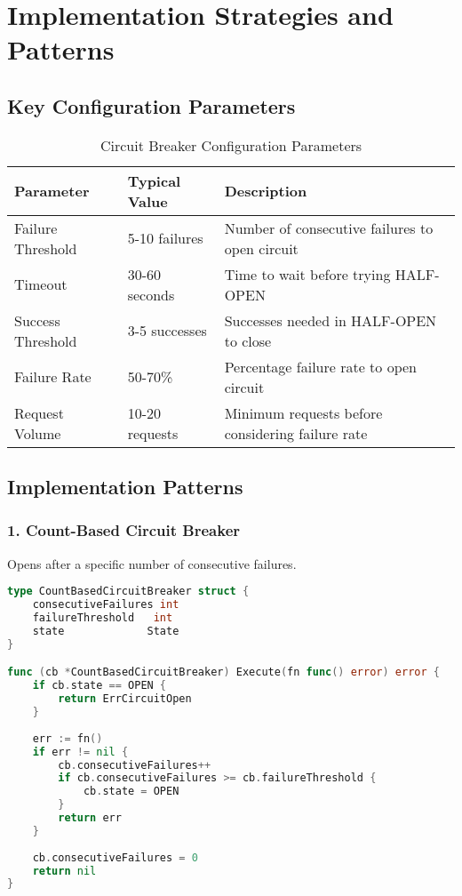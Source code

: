 \documentclass[12pt,a4paper]{article}
\begin{document}
\section{Implementation Strategies and Patterns}

\subsection{Key Configuration Parameters}

\begin{table}[H]
\centering
\begin{tabular}{|l|l|p{6cm}|}
\hline
\textbf{Parameter} & \textbf{Typical Value} & \textbf{Description} \\
\hline
Failure Threshold & 5-10 failures & Number of consecutive failures to open circuit \\
\hline
Timeout & 30-60 seconds & Time to wait before trying HALF-OPEN \\
\hline
Success Threshold & 3-5 successes & Successes needed in HALF-OPEN to close \\
\hline
Failure Rate & 50-70\% & Percentage failure rate to open circuit \\
\hline
Request Volume & 10-20 requests & Minimum requests before considering failure rate \\
\hline
\end{tabular}
\caption{Circuit Breaker Configuration Parameters}
\end{table}

\subsection{Implementation Patterns}

\subsubsection{1. Count-Based Circuit Breaker}
Opens after a specific number of consecutive failures.

\begin{lstlisting}[language=Go, caption=Count-Based Circuit Breaker Logic]
type CountBasedCircuitBreaker struct {
    consecutiveFailures int
    failureThreshold   int
    state             State
}

func (cb *CountBasedCircuitBreaker) Execute(fn func() error) error {
    if cb.state == OPEN {
        return ErrCircuitOpen
    }
    
    err := fn()
    if err != nil {
        cb.consecutiveFailures++
        if cb.consecutiveFailures >= cb.failureThreshold {
            cb.state = OPEN
        }
        return err
    }
    
    cb.consecutiveFailures = 0
    return nil
}
\end{lstlisting}
\end{document}
